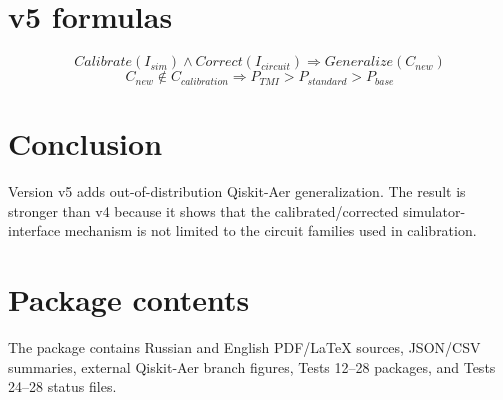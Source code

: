 \documentclass[12pt,a4paper]{article}
\begin{document}
\section{v5 formulas}
\[
\boxed{Calibrate(I_{sim})\land Correct(I_{circuit})\Rightarrow Generalize(C_{new})}
\]
\[
\boxed{C_{new}\notin C_{calibration}\Rightarrow P_{TMI}>P_{standard}>P_{base}}
\]

\section{Conclusion}
Version v5 adds out-of-distribution Qiskit-Aer generalization. The result is stronger than v4 because it shows that the calibrated/corrected simulator-interface mechanism is not limited to the circuit families used in calibration.

\appendix\section{Package contents}
The package contains Russian and English PDF/LaTeX sources, JSON/CSV summaries, external Qiskit-Aer branch figures, Tests 12--28 packages, and Tests 24--28 status files.
\end{document}
